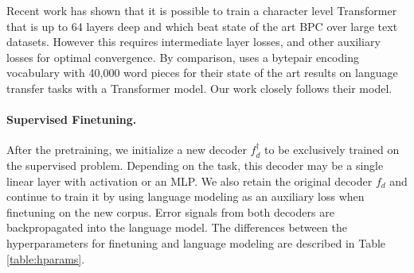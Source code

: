 \documentclass[letterpaper]{article} \usepackage{aaai19}  \usepackage{times}  \usepackage{helvet}  \usepackage{courier}  \usepackage{url}  \usepackage{graphicx}  \usepackage{booktabs}
\begin{document}
Recent work \protect\cite{DeepXformer2018} has shown that it is possible to train a character level Transformer that is up to 64 layers deep and which beat state of the art BPC over large text datasets. However this requires intermediate layer losses, and other auxiliary losses for optimal convergence. By comparison, \protect\cite{Radford2018} uses a bytepair encoding vocabulary with 40,000 word pieces for their state of the art results on language transfer tasks with a Transformer model. Our work closely follows their model. 



\paragraph{Supervised Finetuning.}
After the pretraining, we initialize a new decoder $f_d^{\dagger}$ to be exclusively trained on the supervised problem. Depending on the task, this decoder may be a single linear layer with activation or an MLP. We also retain the original decoder $f_d$ and continue to train it by using language modeling as an auxiliary loss when finetuning on the new corpus. Error signals from both decoders are backpropagated into the language model. The differences between the hyperparameters for finetuning and language modeling are described in Table \ref{table:hparams}.

\begin{table}[!t]
\caption{Hyperparameters for language modeling and finetuning phases.}
\label{table:hparams}
\end{table}
\end{document}
